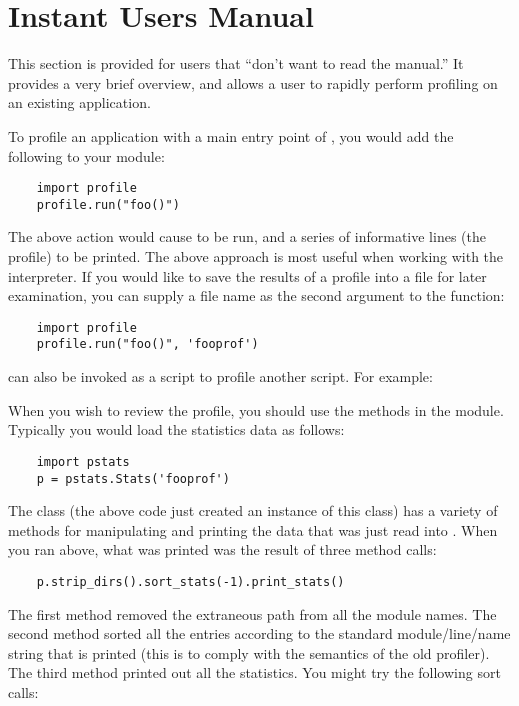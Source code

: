 \section{Instant Users Manual}

This section is provided for users that ``don't want to read the
manual.'' It provides a very brief overview, and allows a user to
rapidly perform profiling on an existing application.

To profile an application with a main entry point of , you
would add the following to your module:

\begin{verbatim}
    import profile
    profile.run("foo()")
\end{verbatim}

The above action would cause  to be run, and a series of
informative lines (the profile) to be printed.  The above approach is
most useful when working with the interpreter.  If you would like to
save the results of a profile into a file for later examination, you
can supply a file name as the second argument to the 
function:

\begin{verbatim}
    import profile
    profile.run("foo()", 'fooprof')
\end{verbatim}

 can also be invoked as
a script to profile another script.  For example:

When you wish to review the profile, you should use the methods in the
 module.  Typically you would load the statistics data as
follows:

\begin{verbatim}
    import pstats
    p = pstats.Stats('fooprof')
\end{verbatim}

The class  (the above code just created an instance of
this class) has a variety of methods for manipulating and printing the
data that was just read into .  When you ran
 above, what was printed was the result of three
method calls:

\begin{verbatim}
    p.strip_dirs().sort_stats(-1).print_stats()
\end{verbatim}

The first method removed the extraneous path from all the module
names. The second method sorted all the entries according to the
standard module/line/name string that is printed (this is to comply
with the semantics of the old profiler).  The third method printed out
all the statistics.  You might try the following sort calls:

